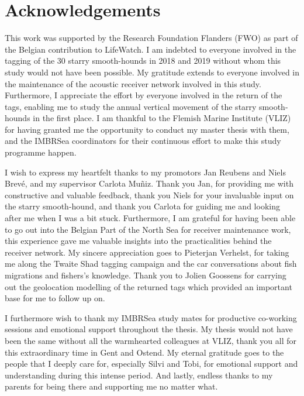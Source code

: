 \documentclass[
  authoryear,
  review,
  3p]{elsarticle}
\begin{document}
\hypertarget{acknowledgements}{%
\section*{Acknowledgements}\label{acknowledgements}}

This work was supported by the Research Foundation Flanders (FWO) as
part of the Belgian contribution to LifeWatch. I am indebted to everyone
involved in the tagging of the 30 starry smooth-hounds in 2018 and 2019
without whom this study would not have been possible. My gratitude
extends to everyone involved in the maintenance of the acoustic receiver
network involved in this study. Furthermore, I appreciate the effort by
everyone involved in the return of the tags, enabling me to study the
annual vertical movement of the starry smooth-hounds in the first place.
I am thankful to the Flemish Marine Institute (VLIZ) for having granted
me the opportunity to conduct my master thesis with them, and the
IMBRSea coordinators for their continuous effort to make this study
programme happen.

I wish to express my heartfelt thanks to my promotors Jan Reubens and
Niels Brevé, and my supervisor Carlota Muñiz. Thank you Jan, for
providing me with constructive and valuable feedback, thank you Niels
for your invaluable input on the starry smooth-hound, and thank you
Carlota for guiding me and looking after me when I was a bit stuck.
Furthermore, I am grateful for having been able to go out into the
Belgian Part of the North Sea for receiver maintenance work, this
experience gave me valuable insights into the practicalities behind the
receiver network. My sincere appreciation goes to Pieterjan Verhelst,
for taking me along the Twaite Shad tagging campaign and the car
conversations about fish migrations and fishers's knowledge. Thank you
to Jolien Goossens for carrying out the geolocation modelling of the
returned tags which provided an important base for me to follow up on.

I furthermore wish to thank my IMBRSea study mates for productive
co-working sessions and emotional support throughout the thesis. My
thesis would not have been the same without all the warmhearted
colleagues at VLIZ, thank you all for this extraordinary time in Gent
and Ostend. My eternal gratitude goes to the people that I deeply care
for, especially Silvi and Tobi, for emotional support and understanding
during this intense period. And lastly, endless thanks to my parents for
being there and supporting me no matter what.
\end{document}
